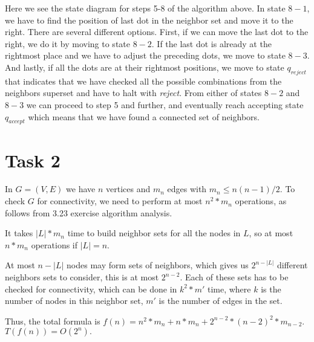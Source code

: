 \documentclass[a4paper, notitlepage]{article}
\begin{document}
\newline\newline
Here we see the state diagram for steps 5-8 of the algorithm above. In state $8-1$, we have to find the position of last dot in the neighbor set and move it to the right. There are several different options. First, if we can move the last dot to the right, we do it by moving to state $8-2$. If the last dot is already at the rightmost place and we have to adjust the preceding dots, we move to state $8-3$. And lastly, if all the dots are at their rightmost positions, we move to state $q_{reject}$ that indicates that we have checked all the possible combinations from the neighbors superset and have to halt with \emph{reject}. From either of states $8-2$ and $8-3$ we can proceed to step 5 and further, and eventually reach accepting state $q_{accept}$ which means that we have found a connected set of neighbors.

\section{Task 2}

In $G = (V,E)$ we have $n$ vertices and $m_n$ edges with $m_n \le n(n-1)/2$. To check $G$ for connectivity, we need to perform at most $n^2*m_n$ operations, as follows from 3.23 exercise algorithm analysis. 

It takes $|L|*m_n$ time to build neighbor sets for all the nodes in $L$, so at most $n*m_n$ operations if $|L| = n$.

At most $n - |L|$ nodes may form sets of neighbors, which gives us $2^{n - |L|}$ different neighbors sets to consider, this is at most $2^{n-2}$. Each of these sets has to be checked for connectivity, which can be done in $k^2*m'$ time, where $k$ is the number of nodes in this neighbor set, $m'$ is the number of edges in the set.

Thus, the total formula is $f(n) = n^2*m_n + n*m_n + 2^{n-2}*(n-2)^2*m_{n-2}$. $T(f(n)) = O(2^n).$
\end{document}
